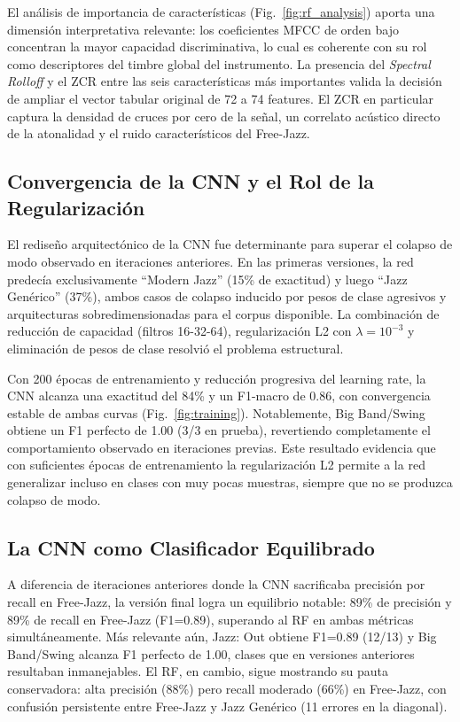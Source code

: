 \documentclass[conference]{IEEEtran}
\begin{document}
El análisis de importancia de características (Fig.~\ref{fig:rf_analysis}) aporta una dimensión interpretativa relevante: los coeficientes MFCC de orden bajo concentran la mayor capacidad discriminativa, lo cual es coherente con su rol como descriptores del timbre global del instrumento. La presencia del \textit{Spectral Rolloff} y el ZCR entre las seis características más importantes valida la decisión de ampliar el vector tabular original de 72 a 74 features. El ZCR en particular captura la densidad de cruces por cero de la señal, un correlato acústico directo de la atonalidad y el ruido característicos del Free-Jazz.

\subsection{Convergencia de la CNN y el Rol de la Regularización}
El rediseño arquitectónico de la CNN fue determinante para superar el colapso de modo observado en iteraciones anteriores. En las primeras versiones, la red predecía exclusivamente ``Modern Jazz'' (15\% de exactitud) y luego ``Jazz Genérico'' (37\%), ambos casos de colapso inducido por pesos de clase agresivos y arquitecturas sobredimensionadas para el corpus disponible. La combinación de reducción de capacidad (filtros 16-32-64), regularización L2 con $\lambda=10^{-3}$ y eliminación de pesos de clase resolvió el problema estructural.

Con 200 épocas de entrenamiento y reducción progresiva del learning rate, la CNN alcanza una exactitud del 84\% y un F1-macro de 0.86, con convergencia estable de ambas curvas (Fig.~\ref{fig:training}). Notablemente, Big Band/Swing obtiene un F1 perfecto de 1.00 (3/3 en prueba), revertiendo completamente el comportamiento observado en iteraciones previas. Este resultado evidencia que con suficientes épocas de entrenamiento la regularización L2 permite a la red generalizar incluso en clases con muy pocas muestras, siempre que no se produzca colapso de modo.

\subsection{La CNN como Clasificador Equilibrado}
A diferencia de iteraciones anteriores donde la CNN sacrificaba precisión por recall en Free-Jazz, la versión final logra un equilibrio notable: 89\% de precisión y 89\% de recall en Free-Jazz (F1=0.89), superando al RF en ambas métricas simultáneamente. Más relevante aún, Jazz: Out obtiene F1=0.89 (12/13) y Big Band/Swing alcanza F1 perfecto de 1.00, clases que en versiones anteriores resultaban inmanejables. El RF, en cambio, sigue mostrando su pauta conservadora: alta precisión (88\%) pero recall moderado (66\%) en Free-Jazz, con confusión persistente entre Free-Jazz y Jazz Genérico (11 errores en la diagonal).
\end{document}
